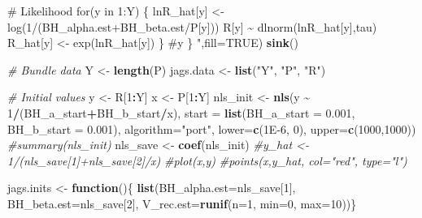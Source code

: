 \documentclass[
]{krantz}
\makeatletter
\newenvironment{Shaded}{\begin{snugshade}}{\end{snugshade}}
\newcommand{\AttributeTok}[1]{\textcolor[rgb]{0.27,0.27,0.27}{#1}}
\newcommand{\CommentTok}[1]{\textcolor[rgb]{0.37,0.37,0.37}{\textit{#1}}}
\newcommand{\ConstantTok}[1]{\textcolor[rgb]{0.37,0.37,0.37}{#1}}
\newcommand{\ControlFlowTok}[1]{\textcolor[rgb]{0.27,0.27,0.27}{\textbf{#1}}}
\newcommand{\DecValTok}[1]{\textcolor[rgb]{0.06,0.06,0.06}{#1}}
\newcommand{\FloatTok}[1]{\textcolor[rgb]{0.06,0.06,0.06}{#1}}
\newcommand{\FunctionTok}[1]{\textcolor[rgb]{0.27,0.27,0.27}{\textbf{#1}}}
\newcommand{\NormalTok}[1]{#1}
\newcommand{\OtherTok}[1]{\textcolor[rgb]{0.37,0.37,0.37}{#1}}
\newcommand{\SpecialCharTok}[1]{\textcolor[rgb]{0.43,0.43,0.43}{\textbf{#1}}}
\newcommand{\StringTok}[1]{\textcolor[rgb]{0.5,0.5,0.5}{#1}}
\newenvironment{kframe}{%
\medskip{}
\setlength{\fboxsep}{.8em}
 \def\at@end@of@kframe{}%
 \ifinner\ifhmode%
  \def\at@end@of@kframe{\end{minipage}}%
  \begin{minipage}{\columnwidth}%
 \fi\fi%
 \def\FrameCommand##1{\hskip\@totalleftmargin \hskip-\fboxsep
 \colorbox{shadecolor}{##1}\hskip-\fboxsep
     \hskip-\linewidth \hskip-\@totalleftmargin \hskip\columnwidth}%
 \MakeFramed {\advance\hsize-\width
   \@totalleftmargin\z@ \linewidth\hsize
   \@setminipage}}%
 {\par\unskip\endMakeFramed%
 \at@end@of@kframe}
\renewenvironment{Shaded}{\begin{kframe}}{\end{kframe}}
\makeatother
\begin{document}
\begin{Shaded}
\begin{Highlighting}[]
\StringTok{\# Likelihood}
\StringTok{    for(y in 1:Y) \{}
\StringTok{      lnR\_hat[y] \textless{}{-} log(1/(BH\_alpha.est+BH\_beta.est/P[y]))}
\StringTok{      R[y] \textasciitilde{} dlnorm(lnR\_hat[y],tau)}
\StringTok{      R\_hat[y] \textless{}{-} exp(lnR\_hat[y])}
\StringTok{      \} \#y}
\StringTok{\}}
\StringTok{    "}\NormalTok{,}\AttributeTok{fill=}\ConstantTok{TRUE}\NormalTok{)}
\FunctionTok{sink}\NormalTok{()}

\CommentTok{\# Bundle data}
\NormalTok{Y }\OtherTok{\textless{}{-}} \FunctionTok{length}\NormalTok{(P)}
\NormalTok{jags.data }\OtherTok{\textless{}{-}} \FunctionTok{list}\NormalTok{(}\StringTok{"Y"}\NormalTok{, }\StringTok{"P"}\NormalTok{, }\StringTok{"R"}\NormalTok{)}

\CommentTok{\# Initial values}
\NormalTok{y }\OtherTok{\textless{}{-}}\NormalTok{ R[}\DecValTok{1}\SpecialCharTok{:}\NormalTok{Y]}
\NormalTok{x }\OtherTok{\textless{}{-}}\NormalTok{ P[}\DecValTok{1}\SpecialCharTok{:}\NormalTok{Y]}
\NormalTok{nls\_init }\OtherTok{\textless{}{-}} \FunctionTok{nls}\NormalTok{(y }\SpecialCharTok{\textasciitilde{}} \DecValTok{1}\SpecialCharTok{/}\NormalTok{(BH\_a\_start}\SpecialCharTok{+}\NormalTok{BH\_b\_start}\SpecialCharTok{/}\NormalTok{x),}
                \AttributeTok{start =} \FunctionTok{list}\NormalTok{(}\AttributeTok{BH\_a\_start =} \FloatTok{0.001}\NormalTok{, }\AttributeTok{BH\_b\_start =} \FloatTok{0.001}\NormalTok{),}
                \AttributeTok{algorithm=}\StringTok{"port"}\NormalTok{, }
                \AttributeTok{lower=}\FunctionTok{c}\NormalTok{(}\FloatTok{1E{-}6}\NormalTok{, }\DecValTok{0}\NormalTok{), }\AttributeTok{upper=}\FunctionTok{c}\NormalTok{(}\DecValTok{1000}\NormalTok{,}\DecValTok{1000}\NormalTok{))}
\CommentTok{\#summary(nls\_init)}
\NormalTok{nls\_save }\OtherTok{\textless{}{-}} \FunctionTok{coef}\NormalTok{(nls\_init)}
\CommentTok{\#y\_hat \textless{}{-} 1/(nls\_save[1]+nls\_save[2]/x)}
\CommentTok{\#plot(x,y)}
\CommentTok{\#points(x,y\_hat, col="red", type="l")}

\NormalTok{jags.inits }\OtherTok{\textless{}{-}} \ControlFlowTok{function}\NormalTok{()\{ }\FunctionTok{list}\NormalTok{(}\AttributeTok{BH\_alpha.est=}\NormalTok{nls\_save[}\DecValTok{1}\NormalTok{],}
                               \AttributeTok{BH\_beta.est=}\NormalTok{nls\_save[}\DecValTok{2}\NormalTok{],}
                               \AttributeTok{V\_rec.est=}\FunctionTok{runif}\NormalTok{(}\AttributeTok{n=}\DecValTok{1}\NormalTok{, }\AttributeTok{min=}\DecValTok{0}\NormalTok{, }\AttributeTok{max=}\DecValTok{10}\NormalTok{))\}}


\end{Highlighting}
\end{Shaded}
\end{document}
